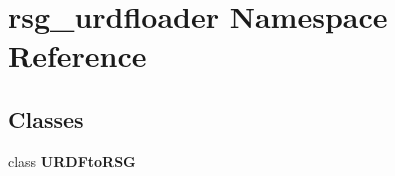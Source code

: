 \section{rsg\-\_\-urdfloader \-Namespace \-Reference}
\label{namespacersg__urdfloader}
\subsection*{\-Classes}
\begin{DoxyCompactItemize}
\item 
class {\bf \-U\-R\-D\-Fto\-R\-S\-G}
\end{DoxyCompactItemize}
